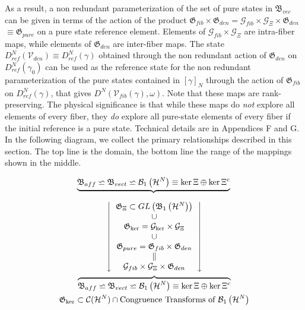 \documentclass[aps,preprint]{revtex4}%
\begin{document}
As a result, a non redundant parameterization of the set of pure states in
$\mathfrak{B}_{vec}$ can be given in terms of the action of the product
$\mathfrak{G}_{fib}\times\mathfrak{G}_{den}=\mathcal{G}_{fib}\times
\mathcal{G}_{\Xi}\times\mathfrak{G}_{den}$ $\equiv\mathfrak{G}_{pure}$ on a
pure state reference element. Elements of $\mathcal{G}_{fib}\times
\mathcal{G}_{\Xi}$ are intra-fiber maps, while elements of $\mathfrak{G}%
_{den}$ are inter-fiber maps. The state $D_{ref}^{N}\left(  \mathcal{V}%
_{den}\right)  \equiv D_{ref}^{N}\left(  \mathcal{\gamma}\right)  $ obtained
through the non redundant action of $\mathfrak{G}_{den}$ on $D_{ref}%
^{N}\left(  \gamma_{0}\right)  $ can be used as the reference state for the
non redundant parameterization of the pure states contained in $\left[
\gamma\right]  _{N}$ through the action of $\mathfrak{G}_{fib}$ on
$D_{ref}^{N}\left(  \mathcal{\gamma}\right)  $, that gives $D^{N}\left(
\mathcal{V}_{fib}\left(  \gamma\right)  ,\mathcal{\omega}\right)  $. Note that
these maps are rank-preserving. The physical significance is that while these
maps do \emph{not} explore all elements of every fiber, they \emph{do} explore
all pure-state elements of every fiber if the initial reference is a pure
state. Technical details are in Appendices F and G. In the following diagram,
we collect the primary relationships described in this section. The top line
is the domain, the bottom line the range of the mappings shown in the middle.%

\begin{gather}
\underbrace{\mathfrak{B}_{aff}\backsimeq\mathfrak{B}_{vect}\backsimeq
\mathcal{B}_{1}\left(  \mathcal{H}^{N}\right)  \equiv\ker\Xi\oplus\ker\Xi^{c}%
}\mathstrut\medskip\nonumber\\
\left\downarrow
\begin{array}
[c]{c}%
\mathfrak{G}_{\Xi}\subset GL\left(  \mathfrak{B}_{1}\left(  \mathcal{H}%
^{N}\right)  \right) \\
\cup\\
\mathfrak{G}_{\ker}=\mathcal{G}_{\ker}\times\mathcal{G}_{\Xi}\\
\cup\\
\mathfrak{G}_{pure}=\mathfrak{G}_{fib}\times\mathfrak{G}_{den}\\
{\LARGE \parallel}\\
\mathcal{G}_{fib}\times\mathcal{G}_{\Xi}\times\mathfrak{G}_{den}%
\end{array}
\right\downarrow \nonumber\\
\overbrace{\mathfrak{B}_{aff}\backsimeq\mathfrak{B}_{vect}\backsimeq
\mathcal{B}_{1}\left(  \mathcal{H}^{N}\right)  \equiv\ker\Xi\oplus\ker\Xi^{c}%
}\nonumber\\
\mathfrak{G}_{\ker}\subset\mathcal{C}(\mathcal{H}^{N})\cap\text{Congruence
Transforms of }\mathcal{B}_{1}\left(  \mathcal{H}^{N}\right)
\end{gather}
\end{document}
